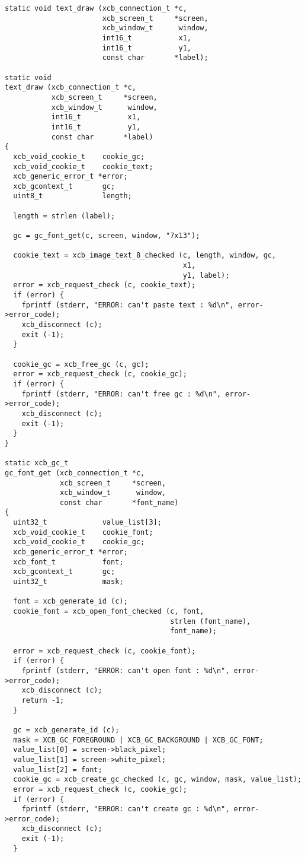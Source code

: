 \documentclass[12pt,oneside,titlepage]{book}
\begin{document}
\begin{enumerate}
\begin{enumerate}
\begin{verbatim}
static void text_draw (xcb_connection_t *c,
                       xcb_screen_t     *screen,
                       xcb_window_t      window,
                       int16_t           x1,
                       int16_t           y1,
                       const char       *label);

static void
text_draw (xcb_connection_t *c,
           xcb_screen_t     *screen,
           xcb_window_t      window,
           int16_t           x1,
           int16_t           y1,
           const char       *label)
{
  xcb_void_cookie_t    cookie_gc;
  xcb_void_cookie_t    cookie_text;
  xcb_generic_error_t *error;
  xcb_gcontext_t       gc;
  uint8_t              length;

  length = strlen (label);

  gc = gc_font_get(c, screen, window, "7x13");

  cookie_text = xcb_image_text_8_checked (c, length, window, gc,
                                          x1,
                                          y1, label);
  error = xcb_request_check (c, cookie_text);
  if (error) {
    fprintf (stderr, "ERROR: can't paste text : %d\n", error->error_code);
    xcb_disconnect (c);
    exit (-1);
  }

  cookie_gc = xcb_free_gc (c, gc);
  error = xcb_request_check (c, cookie_gc);
  if (error) {
    fprintf (stderr, "ERROR: can't free gc : %d\n", error->error_code);
    xcb_disconnect (c);
    exit (-1);
  }
}

static xcb_gc_t
gc_font_get (xcb_connection_t *c,
             xcb_screen_t     *screen,
             xcb_window_t      window,
             const char       *font_name)
{
  uint32_t             value_list[3];
  xcb_void_cookie_t    cookie_font;
  xcb_void_cookie_t    cookie_gc;
  xcb_generic_error_t *error;
  xcb_font_t           font;
  xcb_gcontext_t       gc;
  uint32_t             mask;

  font = xcb_generate_id (c);
  cookie_font = xcb_open_font_checked (c, font,
                                       strlen (font_name),
                                       font_name);

  error = xcb_request_check (c, cookie_font);
  if (error) {
    fprintf (stderr, "ERROR: can't open font : %d\n", error->error_code);
    xcb_disconnect (c);
    return -1;
  }

  gc = xcb_generate_id (c);
  mask = XCB_GC_FOREGROUND | XCB_GC_BACKGROUND | XCB_GC_FONT;
  value_list[0] = screen->black_pixel;
  value_list[1] = screen->white_pixel;
  value_list[2] = font;
  cookie_gc = xcb_create_gc_checked (c, gc, window, mask, value_list);
  error = xcb_request_check (c, cookie_gc);
  if (error) {
    fprintf (stderr, "ERROR: can't create gc : %d\n", error->error_code);
    xcb_disconnect (c);
    exit (-1);
  }


\end{verbatim}
\end{enumerate}
\end{enumerate}
\end{document}
